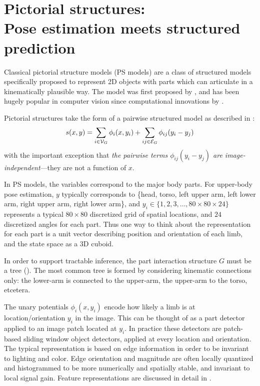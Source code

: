 \chapter{Pictorial structures: \\Pose estimation meets structured prediction} 
\label{sec:ps}
Classical pictorial structure models (PS models) are a class of structured 
models specifically proposed to represent 2D objects with parts which can 
articulate in a kinematically plausible way.  The model was first proposed by 
\citet{fischler1973ps}, and has been hugely popular in computer vision since 
computational innovations by \citet{felz05}.

Pictorial structures take the form of a pairwise structured model as described 
in :
\begin{equation}
s(x,y) = \sum_{i \in \mathcal{V}_G} \phi_i(x,y_i) + \sum_{ij \in \mathcal{E}_G} 
\label{eq:standard-ps}
\phi_{ij}(y_i-y_j)
\end{equation}
with the important exception that {\em the pairwise terms $\phi_{ij}(y_i-y_j)$ 
are image-independent}---they are not a function of $x$.

In PS models, the variables correspond to the major body parts.  For upper-body 
pose estimation, $y$ typically corresponds to \{head, torso, left upper arm, 
left lower arm, right upper arm, right lower arm\}, and $y_i \in 
\{1,2,3,\ldots,80\times 80 \times 24\}$ represents a typical $80 \times 80$ 
discretized grid of spatial locations, and $24$ discretized angles for each 
part.  Thus one way to think about the representation for each part is a unit 
vector describing position and orientation of each limb, and the state space as 
a 3D cuboid. 

 In order to support tractable inference, the part 
interaction structure $G$ must be a tree ().  The most common 
tree is formed by considering kinematic connections only: the lower-arm is 
connected to the upper-arm, the upper-arm to the torso, etcetera.

 The unary potentials $\phi_i(x,y_i)$ encode how 
likely a limb is at location/orientation $y_i$ in the image.  This can be 
thought of as a part detector applied to an image patch located at $y_i$.  In 
practice these detectors are patch-based sliding window object detectors, 
applied at every location and orientation.  The typical representation is based 
on edge information in order to be invariant to lighting and color. Edge 
orientation and magnitude are often locally quantized and histogrammed to be 
more numerically and spatially stable, and invariant to local signal gain.  
Feature representations are discussed in detail in .

